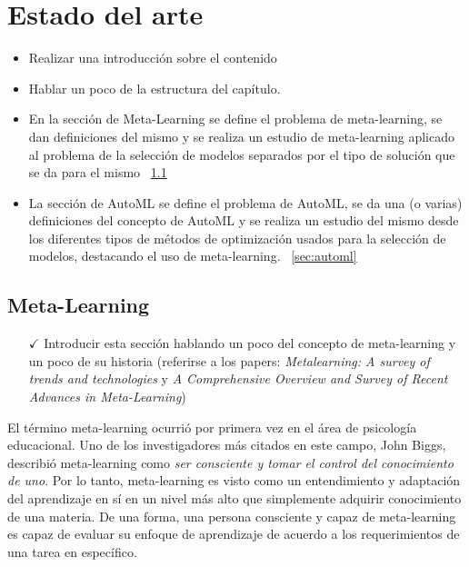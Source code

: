 \chapter{Estado del arte }\label{chapter:review}

 \begin{itemize}
 	\item Realizar una introducción sobre el contenido 
 	\item Hablar un poco de la estructura del capítulo.
 	 \item En la sección de Meta-Learning se define el problema de meta-learning, se dan definiciones del mismo y se realiza un estudio de meta-learning aplicado al problema de la selección de modelos separados por el tipo de solución que se da para el mismo ~\ref{sec:metalearning}
 	\item La sección de AutoML se define el problema de AutoML, se da una (o varias) definiciones del concepto de AutoML y se realiza un estudio del mismo desde los diferentes tipos de métodos de optimización usados para la selección de modelos, destacando el uso de meta-learning. ~\ref{sec:automl}
 \end{itemize}

\section{Meta-Learning}\label{sec:metalearning}

\begin{itemize}
	\item[$\checkmark$] Introducir esta sección hablando un poco del concepto de meta-learning y un poco de su historia (referirse a los papers: \textit{Metalearning: A survey of trends and technologies} y \textit{A Comprehensive Overview and Survey of Recent Advances in Meta-Learning})
\end{itemize}

El término meta-learning ocurrió por primera vez en el área de psicología educacional. Uno de los investigadores más citados en este campo, John Biggs, describió meta-learning como \textit{ser consciente y tomar el control del conocimiento de uno}. Por lo tanto, meta-learning es visto como un entendimiento y adaptación del aprendizaje en sí en un nivel más alto que simplemente adquirir conocimiento de una materia. De una forma, una persona consciente y capaz de meta-learning es capaz de evaluar su enfoque de aprendizaje de acuerdo a los requerimientos de una tarea en específico.

